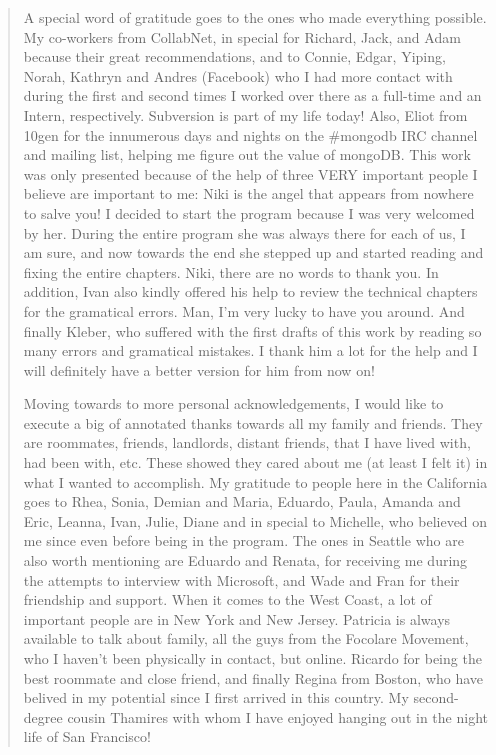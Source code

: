 \documentclass[12pt,oneside]{sfsuthesis}
\theoremstyle{plain} %
\theoremstyle{definition}  %
\theoremstyle{remark}  %
\begin{document}
\begin{quote}
A special word of gratitude goes to the ones who made everything possible.
My co-workers from CollabNet, in special for Richard, Jack, and Adam because
their great recommendations, and to Connie, Edgar, Yiping, Norah, Kathryn and
Andres (Facebook) who I had more contact with during the first and second
times I worked over there as a full-time and an Intern, respectively.
Subversion is part of my life today! Also, Eliot from 10gen for the
innumerous days and nights on the \#mongodb IRC channel and mailing list,
helping me figure out the value of mongoDB. This work was only presented
because of the help of three VERY important people I believe are important to
me: Niki is the angel that appears from nowhere to salve you! I decided to
start the program because I was very welcomed by her. During the entire
program she was always there for each of us, I am sure, and now towards the
end she stepped up and started reading and fixing the entire chapters. Niki,
there are no words to thank you. In addition, Ivan also kindly offered his
help to review the technical chapters for the gramatical errors. Man, I'm very
lucky to have you around. And finally Kleber, who suffered with the first
drafts of this work by reading so many errors and gramatical mistakes. I thank
him a lot for the help and I will definitely have a better version for him from
now on!

Moving towards to more personal acknowledgements, I would like to execute a big
of annotated thanks towards all my family and friends. They are roommates,
friends, landlords, distant friends, that I have lived with, had been with,
etc. These showed they cared about me (at least I felt it) in
what I wanted to accomplish. My gratitude to people here in the California
goes to Rhea, Sonia, Demian and Maria, Eduardo, Paula, Amanda and Eric,
Leanna, Ivan, Julie, Diane and in special to Michelle, who believed on me
since even before being in the program. The ones in Seattle who are also worth
mentioning are Eduardo and Renata, for receiving me during the attempts to
interview with Microsoft, and Wade and Fran for their friendship and support.
When it comes to the West Coast, a lot of important people are in New York and New
Jersey. Patricia is always available to talk about family, all the guys from
the Focolare Movement, who I haven't been physically in contact, but online.
Ricardo for being the best roommate and close friend, and finally Regina from
Boston, who have belived in my potential since I first arrived in this
country. My second-degree cousin Thamires with whom I have enjoyed hanging out
in the night life of San Francisco!


\end{quote}
\end{document}
